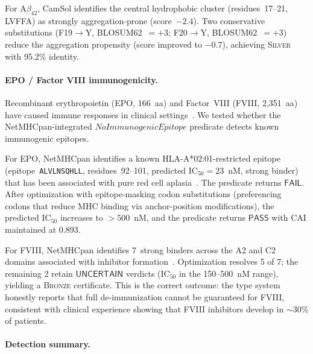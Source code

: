 \documentclass[acmsmall,review,anonymous]{acmart}
\newcommand{\PASS}{\ensuremath{\mathsf{PASS}}\xspace}
\newcommand{\FAIL}{\ensuremath{\mathsf{FAIL}}\xspace}
\newcommand{\UNCERTAIN}{\ensuremath{\mathsf{UNCERTAIN}}\xspace}
\newcommand{\SILVER}{\textsc{Silver}\xspace}
\newcommand{\BRONZE}{\textsc{Bronze}\xspace}
\begin{document}
For A$\beta_{42}$, CamSol identifies the central hydrophobic cluster
(residues~17--21, LVFFA) as strongly aggregation-prone (score~$-2.4$).
Two conservative substitutions (F19$\to$Y, BLOSUM62~$= +3$; F20$\to$Y,
BLOSUM62~$= +3$) reduce the aggregation propensity (score improved to
$-0.7$), achieving \SILVER{} with 95.2\% identity.

\paragraph{EPO / Factor VIII immunogenicity.}
Recombinant erythropoietin (EPO, 166~aa) and Factor~VIII (FVIII,
2,351~aa) have caused immune responses in clinical
settings~\cite{casadevall2002epo,geigert2014immunogenicity}.  We tested
whether the NetMHCpan-integrated $\mathit{NoImmunogenicEpitope}$
predicate detects known immunogenic epitopes.

For EPO, NetMHCpan identifies a known HLA-A*02:01-restricted epitope
(epitope~\texttt{ALVLNSQHLL}, residues~92--101, predicted
IC$_{50} = 23$~nM, strong binder) that has been associated with
pure red cell aplasia~\cite{casadevall2002epo}.  The predicate returns
\FAIL.  After optimization with epitope-masking codon substitutions
(preferencing codons that reduce MHC binding via anchor-position
modifications), the predicted IC$_{50}$ increases to $> 500$~nM, and
the predicate returns \PASS{} with CAI maintained at 0.893.

For FVIII, NetMHCpan identifies 7~strong binders across the A2 and C2
domains associated with inhibitor
formation~\cite{geigert2014immunogenicity}.  Optimization resolves 5 of
7; the remaining 2 retain \UNCERTAIN{} verdicts (IC$_{50}$ in the
150--500~nM range), yielding a \BRONZE{} certificate.  This is the
correct outcome: the type system honestly reports that full de-immunization
cannot be guaranteed for FVIII, consistent with clinical experience
showing that FVIII inhibitors develop in $\sim$30\% of patients.

\paragraph{Detection summary.}
\end{document}
